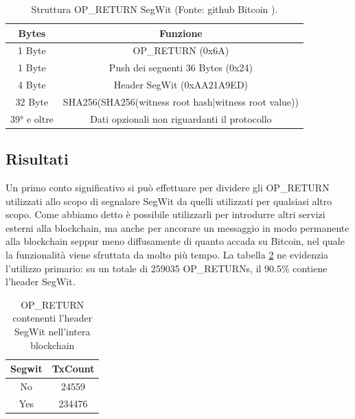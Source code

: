 \begin{table}
	\begin{center}
		\begin{tabular}{|c|c|}
			\hline
			\textbf{Bytes} & \textbf{Funzione} \\ 
			\hline 
			1 Byte	& OP\_RETURN (0x6A) \\ 
			\hline 
			1 Byte	& Push dei seguenti 36 Bytes (0x24) \\ 
			\hline 
			4 Byte	& Header SegWit (0xAA21A9ED) \\ 
			\hline 
			32 Byte	& SHA256(SHA256(witness root hash|witness root value)) \\ 
			\hline 
			39° e oltre	&  Dati opzionali non riguardanti il protocollo\\ 
			\hline
		\end{tabular}
		\caption{Struttura OP\_RETURN SegWit (Fonte: github Bitcoin \cite{bip141}).}
		\label{seg}
	\end{center}
\end{table} 

\subsection{Risultati}

Un primo conto significativo si può effettuare per dividere gli OP\_RETURN utilizzati allo scopo di segnalare SegWit da quelli utilizzati per qualsiasi altro scopo. Come abbiamo detto è possibile utilizzarli per introdurre altri servizi esterni alla blockchain, ma anche per ancorare un messaggio in modo permanente alla blockchain seppur meno diffusamente di quanto accada su Bitcoin, nel quale la funzionalità viene sfruttata da molto più tempo. La tabella \ref{segwityn} ne evidenzia l'utilizzo primario: su un totale di 259035 OP\_RETURNs, il 90.5\% contiene l'header SegWit.

\begin{table}
	\begin{center}
		\begin{tabular}{|c|c|}
			\hline 
			\textbf{Segwit} & \textbf{TxCount} \\ 
			\hline 
			No & 24559 \\ 
			\hline 
			Yes & 234476 \\ 
			\hline 
		\end{tabular} 
		\caption{OP\_RETURN contenenti l'header SegWit nell'intera blockchain}
		\label{segwityn}
	\end{center}
\end{table}


